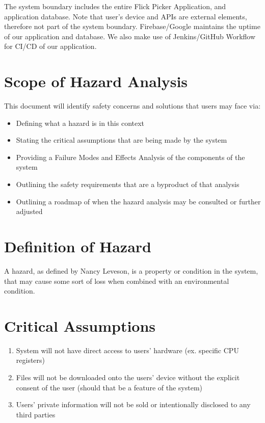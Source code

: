 \documentclass[12pt]{article}
\begin{document}
\noindent The system boundary includes the entire Flick Picker Application, and application database. Note that user's device and APIs are external elements, therefore not part of the system boundary. Firebase/Google maintains the uptime of our application and database. We also make use of Jenkins/GitHub Workflow for CI/CD of our application.

\section{Scope of Hazard Analysis}
This document will identify safety concerns and solutions that users may face via:
\begin{itemize}
	\item Defining what a hazard is in this context
	\item Stating the critical assumptions that are being made by the system
	\item Providing a Failure Modes and Effects Analysis of the components of the system
	\item Outlining the safety requirements that are a byproduct of that analysis
	\item Outlining a roadmap of when the hazard analysis may be consulted or further adjusted
\end{itemize} 

\section{Definition of Hazard}
A hazard, as defined by Nancy Leveson, is a property or condition in the system, that may cause some sort of loss when combined with an environmental condition.

\section{Critical Assumptions}
\begin{enumerate}
	\item System will not have direct access to users' hardware (ex. specific CPU registers)
	\item Files will not be downloaded onto the users' device without the explicit consent of the user (should that be a feature of the system)
	\item Users' private information will not be sold or intentionally disclosed to any third parties
\end{enumerate}
\end{document}
